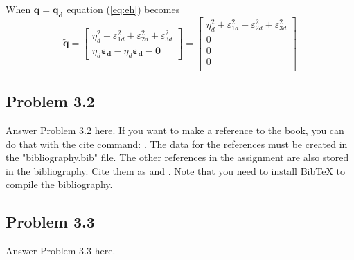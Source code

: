 When $\boldsymbol{q}=\boldsymbol{q_d}$ equation (\ref{eq:eh}) becomes
\begin{equation}
\boldsymbol{\tilde{q}}=
\begin{bmatrix}
\eta^2_d+\varepsilon_{1d}^2+\varepsilon_{2d}^2+\varepsilon_{3d}^2\\
\eta_d\boldsymbol{\varepsilon_{d}}-\eta_d\boldsymbol{\varepsilon_{d}}-\boldsymbol{0}
\end{bmatrix}
=
\begin{bmatrix}
\eta^2_d+\varepsilon_{1d}^2+\varepsilon_{2d}^2+\varepsilon_{3d}^2\\
0\\
0\\
0\\
\end{bmatrix}
\end{equation}

\subsection*{Problem 3.2}
Answer Problem 3.2 here. If you want to make a reference to the book, you can do that with the cite command: \cite{Fossen2011}. The data for the references must be created in the "bibliography.bib" file. The other references in the assignment are also stored in the bibliography. Cite them as \cite{Chateurverdi} and \cite{Fjellstad1994857}. Note that you need to install BibTeX to compile the bibliography.

\subsection*{Problem 3.3}
Answer Problem 3.3 here.
